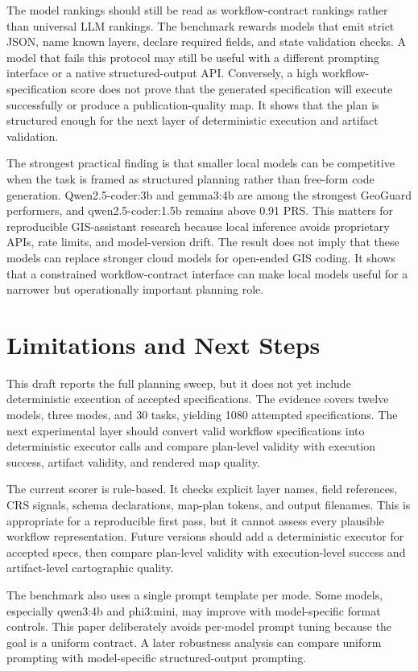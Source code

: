 \documentclass[]{interact}
\begin{document}
The model rankings should still be read as workflow-contract rankings rather than universal LLM rankings. The benchmark rewards models that emit strict JSON, name known layers, declare required fields, and state validation checks. A model that fails this protocol may still be useful with a different prompting interface or a native structured-output API. Conversely, a high workflow-specification score does not prove that the generated specification will execute successfully or produce a publication-quality map. It shows that the plan is structured enough for the next layer of deterministic execution and artifact validation.

The strongest practical finding is that smaller local models can be competitive when the task is framed as structured planning rather than free-form code generation. Qwen2.5-coder:3b and gemma3:4b are among the strongest GeoGuard performers, and qwen2.5-coder:1.5b remains above 0.91 PRS. This matters for reproducible GIS-assistant research because local inference avoids proprietary APIs, rate limits, and model-version drift. The result does not imply that these models can replace stronger cloud models for open-ended GIS coding. It shows that a constrained workflow-contract interface can make local models useful for a narrower but operationally important planning role.

\section{Limitations and Next Steps}

This draft reports the full planning sweep, but it does not yet include deterministic execution of accepted specifications. The evidence covers twelve models, three modes, and 30 tasks, yielding 1080 attempted specifications. The next experimental layer should convert valid workflow specifications into deterministic executor calls and compare plan-level validity with execution success, artifact validity, and rendered map quality.

The current scorer is rule-based. It checks explicit layer names, field references, CRS signals, schema declarations, map-plan tokens, and output filenames. This is appropriate for a reproducible first pass, but it cannot assess every plausible workflow representation. Future versions should add a deterministic executor for accepted specs, then compare plan-level validity with execution-level success and artifact-level cartographic quality.

The benchmark also uses a single prompt template per mode. Some models, especially qwen3:4b and phi3:mini, may improve with model-specific format controls. This paper deliberately avoids per-model prompt tuning because the goal is a uniform contract. A later robustness analysis can compare uniform prompting with model-specific structured-output prompting.
\end{document}
